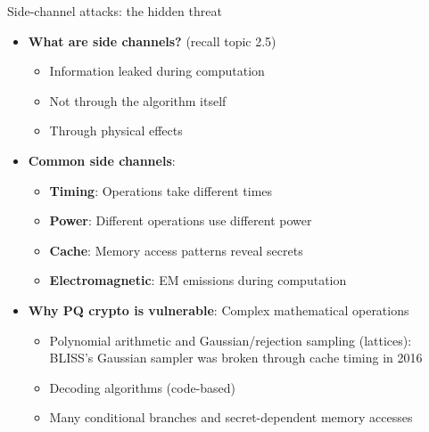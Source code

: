 \ifdefined\PRESENTATION\else\PassOptionsToClass{handout}{beamer}\fi\documentclass[aspectratio=169, lualatex]{beamer}
\begin{document}
\begin{frame}{Side-channel attacks: the hidden threat}
	\begin{itemize}
		\item \textbf{What are side channels?} (recall topic 2.5)
		      \begin{itemize}
			      \item Information leaked during computation
			      \item Not through the algorithm itself
			      \item Through physical effects
		      \end{itemize}
		\item \textbf{Common side channels}:
		      \begin{itemize}
			      \item \textbf{Timing}: Operations take different times
			      \item \textbf{Power}: Different operations use different power
			      \item \textbf{Cache}: Memory access patterns reveal secrets
			      \item \textbf{Electromagnetic}: EM emissions during computation
		      \end{itemize}
		\item \textbf{Why PQ crypto is vulnerable}: Complex mathematical operations
		      \begin{itemize}
			      \item Polynomial arithmetic and Gaussian/rejection sampling (lattices): BLISS's Gaussian sampler was broken through cache timing in 2016
			      \item Decoding algorithms (code-based)
			      \item Many conditional branches and secret-dependent memory accesses
		      \end{itemize}
	\end{itemize}
\end{frame}
\end{document}
